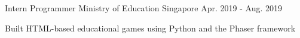 \begin{cventries}
  \cventry
    {Intern Programmer} %
    {Ministry of Education} %
    {Singapore} %
    {Apr. 2019 - Aug. 2019} %
    {
      \begin{cvitems} %
        \item {Built HTML-based educational games using Python and the Phaser framework}
      \end{cvitems}
    }
\end{cventries}

